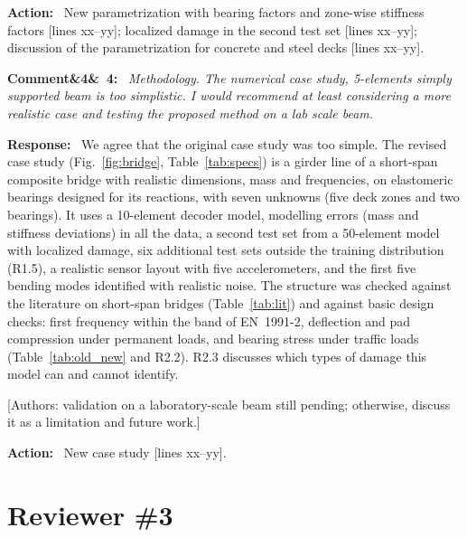 \documentclass[11pt]{article}
\newenvironment{rcomment}[1]{\par\bigskip\noindent\textbf{Comment\ifx&#1&\else\ #1\fi:}\ \itshape}{\par}
\newenvironment{response}{\par\smallskip\noindent\color{resp}\textbf{Response:}\ }{\par}
\newenvironment{action}{\par\smallskip\noindent\color{resp}\textbf{Action:}\ }{\par}
\newcommand{\authornote}[1]{\textcolor{note}{\textsf{[Authors: #1]}}}
\newcommand{\tbd}[1]{\textcolor{note}{\textsf{[#1]}}}
\newcommand{\lines}[1]{\tbd{lines #1}}
\begin{document}
\begin{action}
New parametrization with bearing factors and zone-wise stiffness factors \lines{xx--yy}; localized damage in the
second test set \lines{xx--yy}; discussion of the parametrization for concrete and steel decks \lines{xx--yy}.
\end{action}

\begin{rcomment}{4}
Methodology. The numerical case study, 5-elements simply supported beam is too simplistic. I would recommend at least
considering a more realistic case and testing the proposed method on a lab scale beam.
\end{rcomment}

\begin{response}
We agree that the original case study was too simple. The revised case study (Fig.~\ref{fig:bridge},
Table~\ref{tab:specs}) is a girder line of a short-span composite bridge with realistic dimensions, mass and
frequencies, on elastomeric bearings designed for its reactions, with seven unknowns (five deck zones and two bearings).
It uses a 10-element decoder model, modelling errors (mass and stiffness deviations) in all the data, a second test set
from a 50-element model with localized damage, six additional test sets outside the training distribution (R1.5), a
realistic sensor layout with five accelerometers, and the first five bending modes identified with realistic noise.
The structure was checked against the literature on short-span bridges (Table~\ref{tab:lit}) and against basic design
checks: first frequency within the band of EN~1991-2, deflection and pad compression under permanent loads, and bearing
stress under traffic loads
(Table~\ref{tab:old_new} and R2.2). R2.3 discusses which types of damage this model can and cannot identify.
\end{response}
\authornote{validation on a laboratory-scale beam still pending; otherwise, discuss it as a limitation and future
work.}

\begin{action}
New case study \lines{xx--yy}.
\end{action}

\section{Reviewer \#3}
\end{document}
